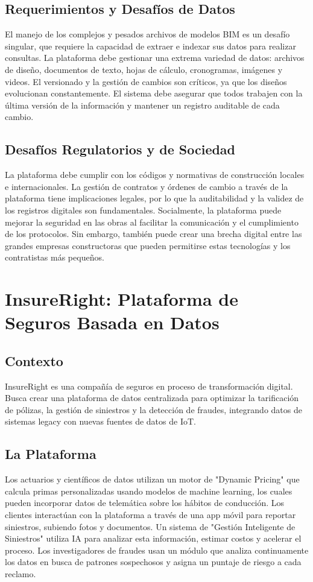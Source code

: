 \documentclass[12pt]{article}
\begin{document}
\subsection{Requerimientos y Desafíos de Datos}
El manejo de los complejos y pesados archivos de modelos BIM es un desafío singular, que requiere la capacidad de extraer e indexar sus datos para realizar consultas. La plataforma debe gestionar una extrema variedad de datos: archivos de diseño, documentos de texto, hojas de cálculo, cronogramas, imágenes y videos. El versionado y la gestión de cambios son críticos, ya que los diseños evolucionan constantemente. El sistema debe asegurar que todos trabajen con la última versión de la información y mantener un registro auditable de cada cambio.

\subsection{Desafíos Regulatorios y de Sociedad}
La plataforma debe cumplir con los códigos y normativas de construcción locales e internacionales. La gestión de contratos y órdenes de cambio a través de la plataforma tiene implicaciones legales, por lo que la auditabilidad y la validez de los registros digitales son fundamentales. Socialmente, la plataforma puede mejorar la seguridad en las obras al facilitar la comunicación y el cumplimiento de los protocolos. Sin embargo, también puede crear una brecha digital entre las grandes empresas constructoras que pueden permitirse estas tecnologías y los contratistas más pequeños.

\newpage

\section{InsureRight: Plataforma de Seguros Basada en Datos}

\subsection{Contexto}
InsureRight es una compañía de seguros en proceso de transformación digital. Busca crear una plataforma de datos centralizada para optimizar la tarificación de pólizas, la gestión de siniestros y la detección de fraudes, integrando datos de sistemas legacy con nuevas fuentes de datos de IoT.

\subsection{La Plataforma}
Los actuarios y científicos de datos utilizan un motor de "Dynamic Pricing" que calcula primas personalizadas usando modelos de machine learning, los cuales pueden incorporar datos de telemática sobre los hábitos de conducción. Los clientes interactúan con la plataforma a través de una app móvil para reportar siniestros, subiendo fotos y documentos. Un sistema de "Gestión Inteligente de Siniestros" utiliza IA para analizar esta información, estimar costos y acelerar el proceso. Los investigadores de fraudes usan un módulo que analiza continuamente los datos en busca de patrones sospechosos y asigna un puntaje de riesgo a cada reclamo.
\end{document}
